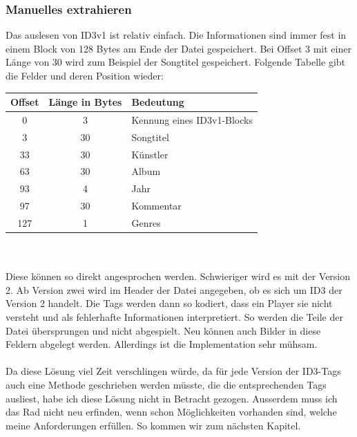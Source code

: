 \documentclass[12pt,a4paper,ngerman]{report}
\begin{document}
\subsubsection{Manuelles extrahieren}
Das auslesen von ID3v1 ist relativ einfach. Die Informationen sind immer fest in einem Block von 128 Bytes am Ende der Datei gespeichert. Bei Offset 3 mit einer Länge von 30 wird zum Beispiel der Songtitel gespeichert. Folgende Tabelle gibt die Felder und deren Position wieder:\\
\begin{tabular}{|c|c|l|} \hline
 \textbf{Offset} & \textbf{Länge in Bytes} & \textbf{Bedeutung}\\
 \hline
 0 & 3 & Kennung eines ID3v1-Blocks\\ \hline
 3 & 30 & Songtitel\\ \hline
 33 & 30 & Künstler\\ \hline
 63 & 30 & Album\\ \hline
 93 & 4 & Jahr\\ \hline
 97 & 30 & Kommentar\\ \hline
 127 & 1 & Genres\\ \hline
\end{tabular} \\ \\
Diese können so direkt angesprochen werden. Schwieriger wird es mit der Version 2. Ab Version zwei wird im Header der Datei angegeben, ob es sich um ID3 der Version 2 handelt. Die Tags werden dann so kodiert, dass ein Player sie nicht versteht und als fehlerhafte Informationen interpretiert. So werden die Teile der Datei übersprungen und nicht abgespielt. Neu können auch Bilder in diese Feldern abgelegt werden. Allerdings ist die Implementation sehr mühsam.
\\
\\
Da diese Lösung viel Zeit verschlingen würde, da für jede Version der ID3-Tags auch eine Methode geschrieben werden müsste, die die entsprechenden Tags ausliest, habe ich diese Lösung nicht in Betracht gezogen. Ausserdem muss ich das Rad nicht neu erfinden, wenn schon Möglichkeiten vorhanden sind, welche meine Anforderungen erfüllen. So kommen wir zum nächsten Kapitel.
\end{document}
